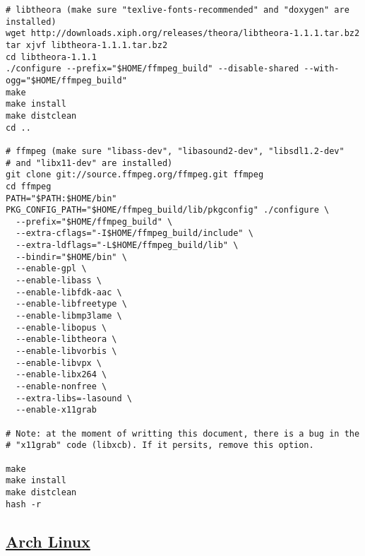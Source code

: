 \begin{itemize}
\begin{verbatim}
# libtheora (make sure "texlive-fonts-recommended" and "doxygen" are installed)
wget http://downloads.xiph.org/releases/theora/libtheora-1.1.1.tar.bz2
tar xjvf libtheora-1.1.1.tar.bz2
cd libtheora-1.1.1
./configure --prefix="$HOME/ffmpeg_build" --disable-shared --with-ogg="$HOME/ffmpeg_build"
make
make install
make distclean
cd ..

# ffmpeg (make sure "libass-dev", "libasound2-dev", "libsdl1.2-dev" 
# and "libx11-dev" are installed)
git clone git://source.ffmpeg.org/ffmpeg.git ffmpeg
cd ffmpeg
PATH="$PATH:$HOME/bin" PKG_CONFIG_PATH="$HOME/ffmpeg_build/lib/pkgconfig" ./configure \
  --prefix="$HOME/ffmpeg_build" \
  --extra-cflags="-I$HOME/ffmpeg_build/include" \
  --extra-ldflags="-L$HOME/ffmpeg_build/lib" \
  --bindir="$HOME/bin" \
  --enable-gpl \
  --enable-libass \
  --enable-libfdk-aac \
  --enable-libfreetype \
  --enable-libmp3lame \
  --enable-libopus \
  --enable-libtheora \
  --enable-libvorbis \
  --enable-libvpx \
  --enable-libx264 \
  --enable-nonfree \
  --extra-libs=-lasound \
  --enable-x11grab

# Note: at the moment of writting this document, there is a bug in the
# "x11grab" code (libxcb). If it persits, remove this option.

make
make install
make distclean
hash -r
\end{verbatim}
\end{itemize}


\subsection{\href{https://wiki.archlinux.org/index.php/FFmpeg}{Arch Linux}}

